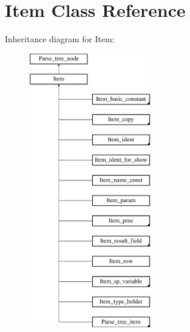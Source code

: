 \hypertarget{classItem}{}\section{Item Class Reference}
\label{classItem}
Inheritance diagram for Item\+:\begin{figure}[H]
\begin{center}
\leavevmode
\includegraphics[height=12.000000cm]{classItem}
\end{center}
\end{figure}
